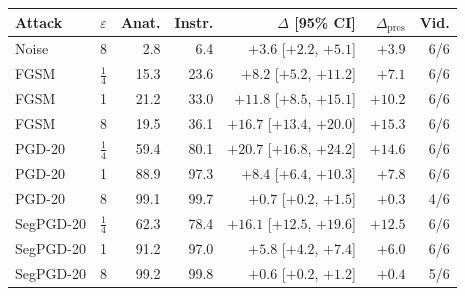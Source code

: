 \begin{tabular}{@{}lrrrrrr@{}}
\toprule
Attack & $\varepsilon$ & Anat. & Instr. & $\Delta$ [95\% CI] & $\Delta_{\mathrm{pres}}$ & Vid. \\
\midrule
Noise & 8 & 2.8 & 6.4 & $+3.6$ [$+2.2$, $+5.1$] & $+3.9$ & 6/6 \\
\addlinespace[1.5pt]
FGSM & $\frac{1}{4}$ & 15.3 & 23.6 & $+8.2$ [$+5.2$, $+11.2$] & $+7.1$ & 6/6 \\
FGSM & 1 & 21.2 & 33.0 & $+11.8$ [$+8.5$, $+15.1$] & $+10.2$ & 6/6 \\
FGSM & 8 & 19.5 & 36.1 & $+16.7$ [$+13.4$, $+20.0$] & $+15.3$ & 6/6 \\
\addlinespace[1.5pt]
PGD-20 & $\frac{1}{4}$ & 59.4 & 80.1 & $+20.7$ [$+16.8$, $+24.2$] & $+14.6$ & 6/6 \\
PGD-20 & 1 & 88.9 & 97.3 & $+8.4$ [$+6.4$, $+10.3$] & $+7.8$ & 6/6 \\
PGD-20 & 8 & 99.1 & 99.7 & $+0.7$ [$+0.2$, $+1.5$] & $+0.3$ & 4/6 \\
\addlinespace[1.5pt]
SegPGD-20 & $\frac{1}{4}$ & 62.3 & 78.4 & $+16.1$ [$+12.5$, $+19.6$] & $+12.5$ & 6/6 \\
SegPGD-20 & 1 & 91.2 & 97.0 & $+5.8$ [$+4.2$, $+7.4$] & $+6.0$ & 6/6 \\
SegPGD-20 & 8 & 99.2 & 99.8 & $+0.6$ [$+0.2$, $+1.2$] & $+0.4$ & 5/6 \\
\bottomrule
\end{tabular}
